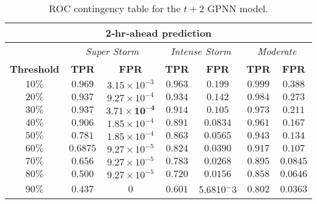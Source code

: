 \begin{table}[ht]
	\centering
	\caption{ROC contingency table for the $t+2$ GPNN model.}
	\label{table:rocgpnn2h}
	\begin{tabular}
		{c| c c | c c | c c}
		\hline
		\multicolumn{7}{c}{\textbf{2‐hr‐ahead prediction}} \\ 
		\hline
		 & \multicolumn{2}{c}{\textit{Super Storm}} & \multicolumn{2}{c}{\textit{Intense Storm}} & \multicolumn{2}{c}{\textit{Moderate}} \\ 
		\hline
		\textbf{Threshold} & \textbf{TPR} & \textbf{FPR} & \textbf{TPR} & \textbf{FPR} & \textbf{TPR} & \textbf{FPR} \\ 
		\hline
		$10\%$ & $0.969$ & $3.15\times10^{-3}$ & $0.963$ & $0.199$ & $0.999$ & $0.388$ \\ 
		$20\%$ & $0.937$ & $9.27\times10^{-4}$ & $0.934$ & $0.142$ & $0.984$ & $0.273$ \\ 
		$30\%$ & $\mathbf{0.937}$ & $\mathbf{3.71\times10^{-4}}$ & $\mathbf{0.914}$ & $\mathbf{0.105}$ & $0.973$ & $0.211$ \\ 
		$40\%$ & $0.906$ & $1.85\times10^{-4}$ & $0.891$ & $0.0834$ & $0.961$ & $0.167$ \\ 
		$50\%$ & $0.781$ & $1.85\times10^{-4}$ & $0.863$ & $0.0565$ & $0.943$ & $0.134$ \\ 
		$60\%$ & $0.6875$ & $9.27\times10^{-5}$ & $0.824$ & $0.0390$ & $\mathbf{0.917}$ & $\mathbf{0.107}$ \\ 
		$70\%$ & $0.656$ & $9.27\times10^{-5}$ & $0.783$ & $0.0268$ & $0.895$ & $0.0845$ \\ 
		$80\%$ & $0.500$ & $9.27\times10^{-5}$ & $0.720$ & $0.0156$ & $0.858$ & $0.0646$ \\ 
		$90\%$ & $0.437$ & $0$ & $0.601$ & 5.6810$^-3$ & $0.802$ & $0.0363$\\
		\hline
	\end{tabular}
\end{table}

